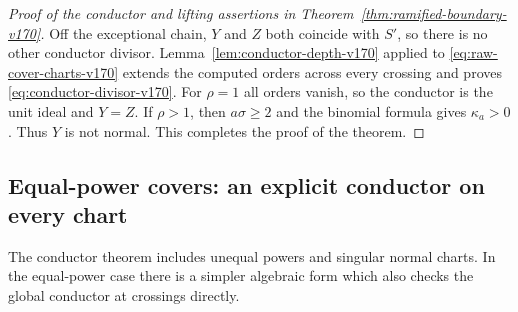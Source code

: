 \begin{proof}[Proof of the conductor and lifting assertions in
Theorem~\ref{thm:ramified-boundary-v170}]
Off the exceptional chain, $Y$ and $Z$ both coincide with $S'$, so
there is no other conductor divisor. Lemma~\ref{lem:conductor-depth-v170}
applied to \eqref{eq:raw-cover-charts-v170} extends the computed
orders across every crossing and proves
\eqref{eq:conductor-divisor-v170}. For $\rho=1$ all orders vanish,
so the conductor is the unit ideal and $Y=Z$. If $\rho>1$, then
$a\sigma\geq2$ and the binomial formula gives $\kappa_a>0$.
Thus $Y$ is not normal. This completes the proof of the theorem.
\end{proof}

\subsection{Equal-power covers: an explicit conductor on every chart}
The conductor theorem includes unequal powers and singular normal
charts. In the equal-power case there is a simpler algebraic form
which also checks the global conductor at crossings directly.

